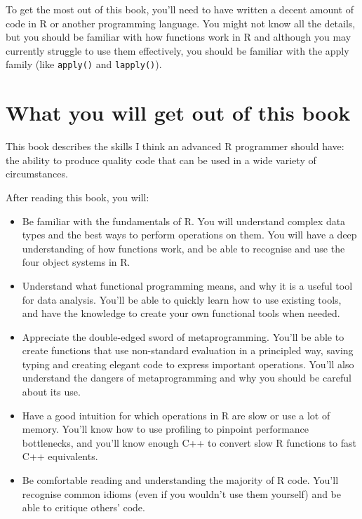 To get the most out of this book, you'll need to have written a decent
amount of code in R or another programming language. You might not know
all the details, but you should be familiar with how functions work in R
and although you may currently struggle to use them effectively, you
should be familiar with the apply family (like \texttt{apply()} and
\texttt{lapply()}).

\hypertarget{what-you-will-get}{%
\section{What you will get out of this book}\label{what-you-will-get}}

This book describes the skills I think an advanced R programmer should
have: the ability to produce quality code that can be used in a wide
variety of circumstances.

After reading this book, you will:

\begin{itemize}
\item
  Be familiar with the fundamentals of R. You will understand complex
  data types and the best ways to perform operations on them. You will
  have a deep understanding of how functions work, and be able to
  recognise and use the four object systems in R.
\item
  Understand what functional programming means, and why it is a useful
  tool for data analysis. You'll be able to quickly learn how to use
  existing tools, and have the knowledge to create your own functional
  tools when needed.
\item
  Appreciate the double-edged sword of metaprogramming. You'll be able
  to create functions that use non-standard evaluation in a principled
  way, saving typing and creating elegant code to express important
  operations. You'll also understand the dangers of metaprogramming and
  why you should be careful about its use.
\item
  Have a good intuition for which operations in R are slow or use a lot
  of memory. You'll know how to use profiling to pinpoint performance
  bottlenecks, and you'll know enough C++ to convert slow R functions to
  fast C++ equivalents.
\item
  Be comfortable reading and understanding the majority of R code.
  You'll recognise common idioms (even if you wouldn't use them
  yourself) and be able to critique others' code.
\end{itemize}


